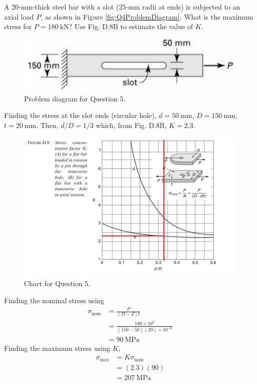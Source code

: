 \section{}
A 20-mm-thick steel bar with a slot (25-mm radii at ends) is subjected to an axial load $P$, as shown in Figure \ref{fig:Q4ProblemDiagram}.
What is the maximum stress for $P = \qty{180}{\kilo\newton}$? Use Fig. D.8B to estimate the value of $K$.

\begin{figure}[h]
    \centering
    \includegraphics[width=0.5\linewidth]{Questions/Figures/Q5ProblemDiagram.png}
    \caption{Problem diagram for Question 5.}
    \label{fig:Q5}
\end{figure}

Finding the stress at the slot ends (circular hole), $d = \qty{50}{\milli\meter}$, $D = \qty{150}{\milli\meter}$, $t = \qty{20}{\milli\meter}$.
Then, $d/D = 1/3$ which, from Fig. D.8B, $K = 2.3$.
\begin{figure}[h]
    \centering
    \includegraphics[width=0.5\linewidth]{Questions/Figures/Q5Chart.png}
    \caption{Chart for Question 5.}
    \label{fig:Q5Chart}
\end{figure}
Finding the nominal stress using
\begin{align*}
    \sigma_{\text{nom}} &= \frac{P}{(D-d)t} \\
    &= \frac{180\times 10^3}{(150-50)(20)\times 10^{-6}} \\
    &=\qty{90}{\mega\pascal}
\end{align*}
Finding the maximum stress using $K$,
\begin{align*}
    \sigma_{\text{max}} &= K \sigma_{\text{nom}} \\
    &= (2.3)(90) \\
    &= \boxed{\qty{207}{\mega\pascal}}
\end{align*}